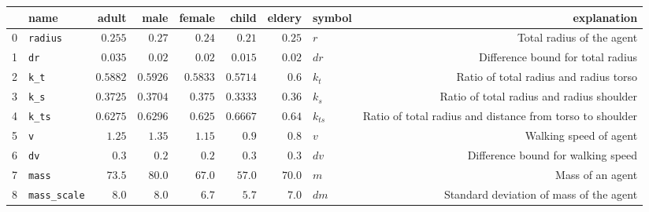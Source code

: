 \begin{tabularx}{\linewidth}{llrrrrrlR}
\toprule
{} &               name &    adult &     male &   female &    child & eldery &    symbol &                                                explanation \\
 &  \verb|radius| & $0.255$ & $0.27$ & $0.24$ & $0.21$ & $0.25$ &  $r$ &  Total radius of the agent \\
1 &  \verb|dr| & $0.035$ & $0.02$ & $0.02$ & $0.015$ & $0.02$ &  $dr$ &  Difference bound for total radius \\
2 &  \verb|k_t| & $0.5882$ & $0.5926$ & $0.5833$ & $0.5714$ & $0.6$ &  $k_{t}$ &  Ratio of total radius and radius torso \\
3 &  \verb|k_s| & $0.3725$ & $0.3704$ & $0.375$ & $0.3333$ & $0.36$ &  $k_{s}$ &  Ratio of total radius and radius shoulder \\
4 &  \verb|k_ts| & $0.6275$ & $0.6296$ & $0.625$ & $0.6667$ & $0.64$ &  $k_{ts}$ &  Ratio of total radius and distance from torso to shoulder \\
5 &  \verb|v| & $1.25$ & $1.35$ & $1.15$ & $0.9$ & $0.8$ &  $v$ &  Walking speed of agent \\
6 &  \verb|dv| & $0.3$ & $0.2$ & $0.2$ & $0.3$ & $0.3$ &  $dv$ &  Difference bound for walking speed \\
7 &  \verb|mass| & $73.5$ & $80.0$ & $67.0$ & $57.0$ & $70.0$ &  $m$ &  Mass of an agent \\
8 &  \verb|mass_scale| & $8.0$ & $8.0$ & $6.7$ & $5.7$ & $7.0$ &  $dm$ &  Standard deviation of mass of the agent \\
\bottomrule
\end{tabularx}
